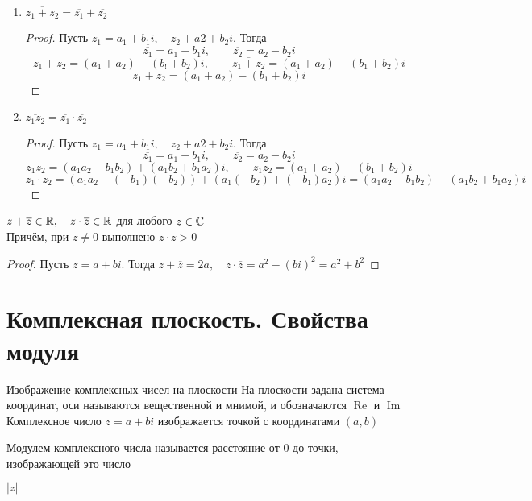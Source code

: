 \begin{props}
	\item
	\begin{enumerate}
		\item $\overline{z_1 + z_2} = \overline{z_1} + \overline{z_2} $
		\begin{proof}
			Пусть $z_1 = a_1 + b_1i, \quad z_2 + a2 + b_2i$. Тогда
			$$ \overline{z_1} = a_1 - b_1i, \qquad \overline{z_2} = a_2 - b_2i $$
			$$ z_1 + z_2 = (a_1 + a_2) + (b_! + b_2)i, \qquad \overline{z_1 + z_2} = (a_1 + a_2) - (b_1 + b_2)i $$
			$$ \overline{z_1} + \overline{z_2} = (a_1 + a_2) - (b_1 + b_2)i $$
		\end{proof}
		\item $ \overline{z_1z_2} = \overline{z_1} \cdot \overline{z_2} $
		\begin{proof}
			Пусть $z_1 = a_1 + b_1i, \quad z_2 + a2 + b_2i$. Тогда
			$$ \overline{z_1} = a_1 - b_1i, \qquad \overline{z_2} = a_2 - b_2i $$
			$$ z_1z_2 = (a_1a_2 - b_1b_2) + (a_1b_2 + b_1a_2)i, \qquad \overline{z_1z_2} = (a_1 + a_2) - (b_1 + b_2)i $$
			$$ \overline{z_1} \cdot \overline{z_2} = (a_1a_2 - (-b_1)(-b_2)) + (a_1(-b_2) + (-b_1)a_2)i = (a_1a_2 - b_1b_2) - (a_1b_2 + b_1a_2)i $$
		\end{proof}
	\end{enumerate}
	\item $z + \overline{z} \in \mathbb{R}, \quad z \cdot \overline{z} \in \mathbb{R}$ для любого $z \in \mathbb{C}$ \\
	Причём, при $z \ne 0$ выполнено $z \cdot \overline{z} > 0$
	\begin{proof}
		Пусть $z = a + bi$. Тогда $z + \overline{z} = 2a, \quad z \cdot \overline{z} = a^2 - (bi)^2 = a^2 + b^2 $
	\end{proof}
\end{props}

\section{Комплексная плоскость. Свойства модуля}

\begin{undefthm}{Изображение комплексных чисел на плоскости}
	На плоскости задана система координат, оси называются вещественной и мнимой, и обозначаются $\operatorname{Re}$ и $\operatorname{Im}$ \\
	Комплексное число $z = a + bi$ изображается точкой с координатами $(a, b)$
\end{undefthm}

\begin{definition}
	Модулем комплексного числа называется расстояние от 0 до точки, изображающей это число
	\begin{notation}
		$|z|$
	\end{notation}
\end{definition}

